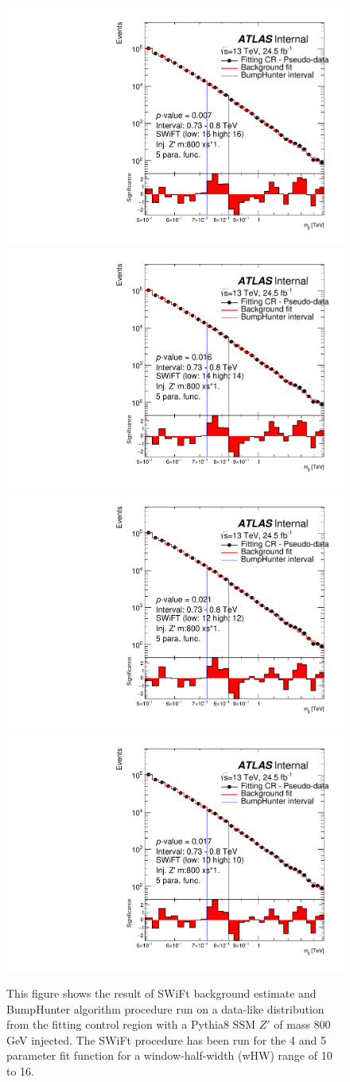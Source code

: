 \begin{figure}[!htb]
{}
 {
  \includegraphics[width=0.3\linewidth, angle=0]{figs/Dibjet/LowMass/FitStudy/bhFit_corrFitCR_dataLike_5para_low16_high16_inj_Zprimebb800_xsFactor1.pdf}
}
 {
  \includegraphics[width=0.3\linewidth, angle=0]{figs/Dibjet/LowMass/FitStudy/bhFit_corrFitCR_dataLike_5para_low14_high14_inj_Zprimebb800_xsFactor1.pdf}
}\\
 {
  \includegraphics[width=0.3\linewidth, angle=0]{figs/Dibjet/LowMass/FitStudy/bhFit_corrFitCR_dataLike_5para_low12_high12_inj_Zprimebb800_xsFactor1.pdf}
}
 {
  \includegraphics[width=0.3\linewidth, angle=0]{figs/Dibjet/LowMass/FitStudy/bhFit_corrFitCR_dataLike_5para_low10_high10_inj_Zprimebb800_xsFactor1.pdf}
}
\vspace{10pt}
\caption{\label{fig:bhFit_lm_corrFitCR_dataLike_inj_Zprimebb800_xsFactor1}
  This figure shows the result of SWiFt background estimate and {\sc BumpHunter} algorithm procedure run on a data-like distribution
  from the fitting control region with a Pythia8 SSM $Z'$ of mass 800 GeV injected.
  The SWiFt procedure has been run for the 4 and 5 parameter fit function for a window-half-width (wHW) range of 10 to 16.
}
\end{figure}


